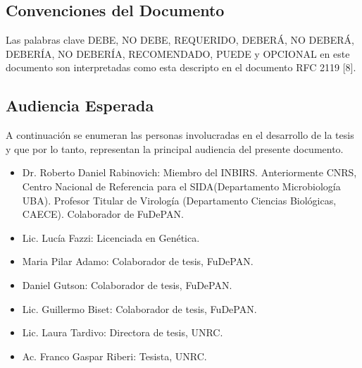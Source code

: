 \documentclass[12pt,a4paper,english,spanish]{article}
\begin{document}
\subsection{Convenciones del Documento}
Las palabras clave DEBE, NO DEBE, REQUERIDO, DEBERÁ, NO DEBERÁ, DEBERÍA, NO DEBERÍA, RECOMENDADO, PUEDE y OPCIONAL
en este documento son interpretadas como esta descripto en el documento RFC
2119 [8]. 

\subsection{Audiencia Esperada}
\par A continuación se enumeran las personas involucradas en el desarrollo de la
tesis y que por lo tanto, representan la principal audiencia del presente documento.
\begin{itemize}
	\item Dr. Roberto Daniel Rabinovich: Miembro del INBIRS. Anteriormente CNRS, Centro Nacional de Referencia para el SIDA(Departamento Microbiología 											UBA). Profesor Titular de Virología (Departamento Ciencias Biológicas, CAECE). Colaborador de FuDePAN.
	\item Lic. Lucía Fazzi: Licenciada en Genética.
	\item Maria Pilar Adamo: Colaborador de tesis, FuDePAN. 
	\item Daniel Gutson: Colaborador de tesis, FuDePAN. 
	\item Lic. Guillermo Biset: Colaborador de tesis, FuDePAN. 
	\item Lic. Laura Tardivo: Directora de tesis, UNRC. 
	\item Ac. Franco Gaspar Riberi: Tesista, UNRC.
\end{itemize}
\end{document}
